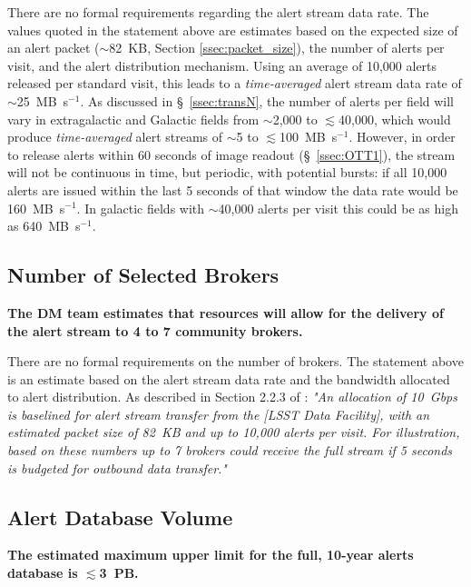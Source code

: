 \documentclass[DM,lsstdraft,authoryear,toc]{lsstdoc}
\begin{document}
There are no formal requirements regarding the alert stream data rate. The values quoted in the statement above are estimates based on the expected size of an alert packet ($\sim$82~KB, Section \ref{ssec:packet_size}), the number of alerts per visit, and the alert distribution mechanism. Using an average of 10,000 alerts released per standard visit, this leads to a {\it time-averaged} alert stream data rate of  $\sim$25~MB~s$^{-1}$. As discussed in \S~\ref{ssec:transN}, the number of alerts per field will vary in extragalactic and Galactic fields from $\sim$2,000 to $\lesssim$40,000, which would produce {\it time-averaged} alert streams of $\sim$5 to $\lesssim$100~MB~s$^{-1}$. However, in order to release alerts within 60 seconds of image readout (\S~\ref{ssec:OTT1}), the stream will not be continuous in time, but periodic, with potential bursts: if all 10,000 alerts are issued within the last 5 seconds of that window the data rate would be 160~MB~s$^{-1}$. In galactic fields with $\sim$40,000 alerts per visit this could be as high as 640~MB~s$^{-1}$.


\subsection{Number of Selected Brokers}\label{ssec:num_brokers}

{\bf The DM team estimates that resources will allow for the delivery of the alert stream to 4 to 7 community brokers.}

There are no formal requirements on the number of brokers. The statement above is an estimate based on the alert stream data rate and the bandwidth allocated to alert distribution. As described in Section 2.2.3 of : {\it "An allocation of 10~Gbps is baselined for alert stream transfer from the [LSST Data Facility], with an estimated packet size of 82~KB and up to 10,000 alerts per visit. For illustration, based on these numbers up to 7 brokers could receive the full stream if 5 seconds is budgeted for outbound data transfer."} 


\subsection{Alert Database Volume}\label{ssec:adb_volume}

{\bf The estimated maximum upper limit for the full, 10-year alerts database is $\lesssim$3~PB.}
\end{document}
